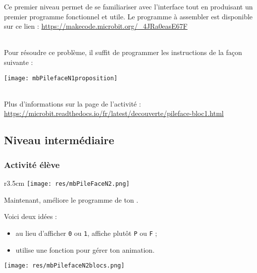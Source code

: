 Ce premier niveau permet de se familiariser avec l’interface tout en produisant un premier programme fonctionnel et utile.
Le programme à assembler est disponible sur ce lien : \url{https://makecode.microbit.org/_4JRa0easE67F}
\begin{minipage}[t]{0.5\linewidth}
    \begin{methode}~\\
    Pour résoudre ce problème, il suffit de programmer les instructions de la façon suivante :
    
    \texttt{[image: mbPilefaceN1proposition]}
    \end{methode}
\end{minipage}
\hfill
\begin{minipage}[t]{0.5\linewidth}
    \begin{remarque}~\\
    Plus d'informations sur la page de l'activité :\\ \url{https://microbit.readthedocs.io/fr/latest/decouverte/pileface-bloc1.html}
    \end{remarque}
\end{minipage}









%
%
\newpage
\subsection{Niveau intermédiaire}
\subsubsection{Activité élève}



\begin{wrapfigure}[4]{r}{3.5cm}
    \texttt{[image: res/mbPileFaceN2.png]}
\end{wrapfigure}
\begin{eleve}
Maintenant, {\Large{améliore}} le programme de ton \mb.

Voici deux idées :
\begin{itemize}
    \item au lieu d'afficher \texttt{0} ou \texttt{1}, affiche plutôt \texttt{P} ou \texttt{F} ;
    \item utilise une fonction pour gérer ton animation.
\end{itemize}
\texttt{[image: res/mbPilefaceN2blocs.png]}
\end{eleve}


